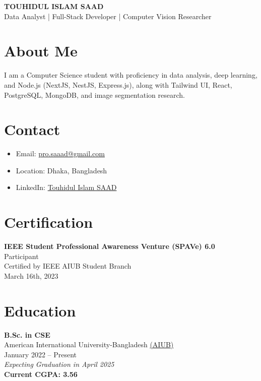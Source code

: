 \documentclass[a4paper,10pt]{article}
\begin{document}
\begin{center}
    \Large \textbf{TOUHIDUL ISLAM SAAD}\\
    \normalsize Data Analyst | Full-Stack Developer | Computer Vision Researcher\\
    \vspace{1em}
\end{center}

\pagestyle{empty}

\begin{paracol}{2}

\switchcolumn[0]
\section*{About Me}
I am a Computer Science student with proficiency in data analysis, deep learning, and Node.js (NextJS, NestJS, Express.js), along with Tailwind UI, React, PostgreSQL, MongoDB, and image segmentation research.

\section*{Contact}
\begin{itemize}
    \item Email: \href{mailto:pro.saaad@gmail.com}{pro.saaad@gmail.com}
    \item Location: Dhaka, Bangladesh
    \item LinkedIn:  \href{https://linkedin.com/in/saadsaadsaad/}{Touhidul Islam SAAD}
\end{itemize}

\section*{Certification}
\textbf{IEEE Student Professional Awareness Venture (SPAVe) 6.0} \\
Participant \\
Certified by IEEE AIUB Student Branch \\
March 16th, 2023

\section*{Education}
\textbf{B.Sc. in CSE} \\
American International University-Bangladesh \href{https://www.aiub.edu}{(AIUB)} \\
January 2022 -- Present \\
\textit{Expecting Graduation in April 2025} \\
\textbf{Current CGPA: 3.56}



\end{paracol}
\end{document}

